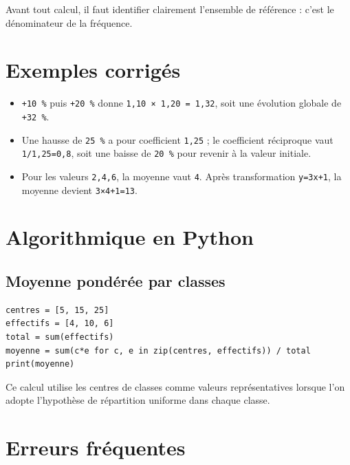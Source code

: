 Avant tout calcul, il faut identifier clairement l'ensemble de référence : c'est le dénominateur de la fréquence.

\section{Exemples corrigés}

\begin{itemize}
\item \texttt{+10 \%} puis \texttt{+20 \%} donne \texttt{1,10 × 1,20 = 1,32}, soit une évolution globale de \texttt{+32 \%}.
\item Une hausse de \texttt{25 \%} a pour coefficient \texttt{1,25} ; le coefficient réciproque vaut \texttt{1/1,25=0,8}, soit une baisse de \texttt{20 \%} pour revenir à la valeur initiale.
\item Pour les valeurs \texttt{2,4,6}, la moyenne vaut \texttt{4}. Après transformation \texttt{y=3x+1}, la moyenne devient \texttt{3×4+1=13}.
\end{itemize}


\section{Algorithmique en Python}

\subsection{Moyenne pondérée par classes}

\begin{verbatim}
centres = [5, 15, 25]
effectifs = [4, 10, 6]
total = sum(effectifs)
moyenne = sum(c*e for c, e in zip(centres, effectifs)) / total
print(moyenne)
\end{verbatim}

Ce calcul utilise les centres de classes comme valeurs représentatives lorsque l'on adopte l'hypothèse de répartition uniforme dans chaque classe.

\section{Erreurs fréquentes}


